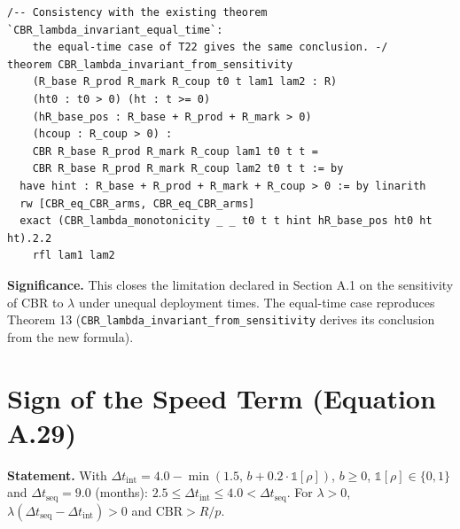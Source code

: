 \documentclass[11pt,a4paper]{article}
\begin{document}
\begin{lstlisting}
/-- Consistency with the existing theorem `CBR_lambda_invariant_equal_time`:
    the equal-time case of T22 gives the same conclusion. -/
theorem CBR_lambda_invariant_from_sensitivity
    (R_base R_prod R_mark R_coup t0 t lam1 lam2 : R)
    (ht0 : t0 > 0) (ht : t >= 0)
    (hR_base_pos : R_base + R_prod + R_mark > 0)
    (hcoup : R_coup > 0) :
    CBR R_base R_prod R_mark R_coup lam1 t0 t t =
    CBR R_base R_prod R_mark R_coup lam2 t0 t t := by
  have hint : R_base + R_prod + R_mark + R_coup > 0 := by linarith
  rw [CBR_eq_CBR_arms, CBR_eq_CBR_arms]
  exact (CBR_lambda_monotonicity _ _ t0 t t hint hR_base_pos ht0 ht ht).2.2
    rfl lam1 lam2
\end{lstlisting}

	\noindent\textbf{Significance.} This closes the limitation declared in Section A.1 on the sensitivity of CBR to $\lambda$ under unequal deployment times. The equal-time case reproduces Theorem 13 (\texttt{CBR\_lambda\_invariant\_from\_sensitivity} derives its conclusion from the new formula).

	\section{Sign of the Speed Term (Equation A.29)}

	\textbf{Statement.} With $\Delta t_{\text{int}}=4.0-\min(1.5,\,b+0.2\cdot\mathbb{1}[\rho])$, $b\ge0$, $\mathbb{1}[\rho]\in\{0,1\}$ and $\Delta t_{\text{seq}}=9.0$ (months): $2.5\le\Delta t_{\text{int}}\le4.0<\Delta t_{\text{seq}}$. For $\lambda>0$, $\lambda(\Delta t_{\text{seq}}-\Delta t_{\text{int}})>0$ and $\text{CBR}>R/p$.
\end{document}
